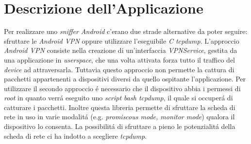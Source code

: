 \documentclass[12pt]{article} %
\begin{document}








\section{Descrizione dell'Applicazione} %

Per realizzare uno \textit{sniffer Android} c'erano due strade alternative da poter seguire: sfruttare le \textit{Android VPN} oppure utilizzare l'eseguibile \textit{C tcpdump}. L'approccio \textit{Android VPN} consiste nella creazione di un'interfaccia \textit{VPNService}, gestita da una applicazione in \textit{userspace}, che una volta attivata forza tutto il traffico del \textit{device} ad attraversarla. Tuttavia questo approccio non permette la cattura di pacchetti appartenenti a dispositivi diversi da quello ospitante l'applicazione. Per utilizzare il secondo approccio \'e necessario che il dispositivo abbia i permessi di \textit{root} in quanto verr\'a eseguito uno \textit{script bash tcpdump}, il quale si occuper\'a di catturare i pacchetti. Inoltre questa libreria permette di sfruttare la scheda di rete in uso in varie modalit\'a (e.g. \textit{promiscous mode, monitor mode}) qualora il dispositivo lo consenta. La possibilit\'a di sfruttare a pieno le potenzialit\'a della scheda di rete ci ha indotto a scegliere \textit{tcpdump}.     
\end{document}
